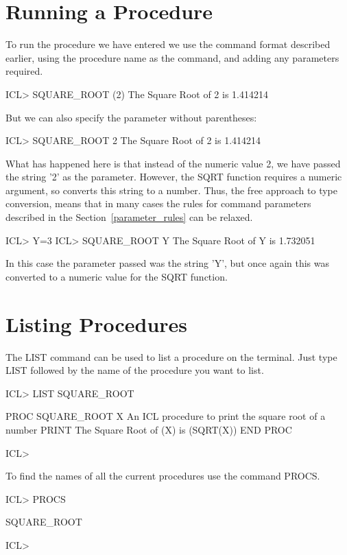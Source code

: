 \documentclass[twoside,11pt,nolof,chapters]{starlink}
\begin{document}
\section{Running a Procedure}
To run the procedure we have entered we use the command format described
earlier, using the procedure name as the command, and adding any parameters
required.
\begin{terminalv}
    ICL> SQUARE_ROOT (2)
    The Square Root of         2 is 1.414214
\end{terminalv}
But we can also specify the parameter without parentheses:
\begin{terminalv}
    ICL> SQUARE_ROOT 2
    The Square Root of 2 is  1.414214
\end{terminalv}
What has happened here is that instead of the numeric value 2, we have
passed the string '2' as the parameter. However, the SQRT function requires
a numeric argument, so converts this string to a number. Thus, the free
approach to type conversion, means that in many cases the rules for command
parameters described in the Section~\ref{parameter_rules} can be relaxed.
\begin{terminalv}
    ICL> Y=3
    ICL> SQUARE_ROOT Y
    The Square Root of Y is  1.732051
\end{terminalv}
In this case the parameter passed was the string 'Y', but once again this
was converted to a numeric value for the SQRT function.
\section{Listing Procedures}
The LIST command can be used to list a procedure on the terminal. Just type
LIST followed by the name of the procedure you want to list.
\begin{terminalv}
    ICL> LIST SQUARE_ROOT


        PROC SQUARE_ROOT X
        {  An ICL procedure to print the square root of a number  }
        PRINT The Square Root of (X) is (SQRT(X))
        END PROC

    ICL>
\end{terminalv}
To find the names of all the current procedures use the command PROCS.
\begin{terminalv}
    ICL> PROCS

    SQUARE_ROOT

    ICL>
\end{terminalv}
\end{document}
